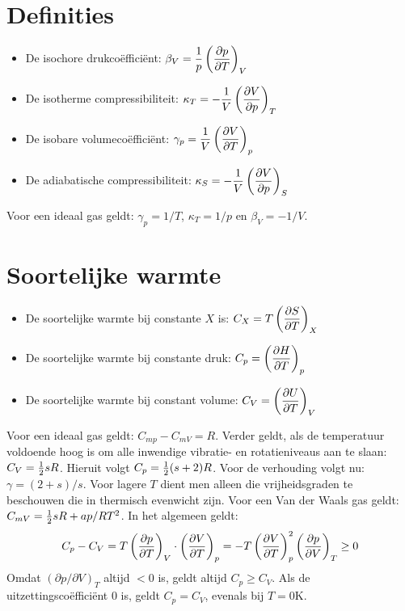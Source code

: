 \section{Definities}
\begin{itemize}
\item De isochore drukco\"effici\"ent: $\displaystyle \beta_V=\frac{1}{p}\left(\frac{\partial p}{\partial T}\right)_{V}$
\item De isotherme compressibiliteit: $\displaystyle \kappa_T=-\frac{1}{V}\left(\frac{\partial V}{\partial p}\right)_{T}$
\item De isobare volumeco\"effici\"ent: $\displaystyle \gamma_p=\frac{1}{V}\left(\frac{\partial V}{\partial T}\right)_{p}$
\item De adiabatische compressibiliteit: $\displaystyle \kappa_S=-\frac{1}{V}\left(\frac{\partial V}{\partial p}\right)_{S}$
\end{itemize}
Voor een ideaal gas geldt: $\gamma_p=1/T$, $\kappa_T=1/p$ en $\beta_V=-1/V$.

\section{Soortelijke warmte}
\begin{itemize}
\item De soortelijke warmte bij constante $X$ is: $\displaystyle C_X=T\left(\frac{\partial S}{\partial T}\right)_{X}$
\item De soortelijke warmte bij constante druk: $\displaystyle C_p=\left(\frac{\partial H}{\partial T}\right)_{p}$
\item De soortelijke warmte bij constant volume: $\displaystyle C_V=\left(\frac{\partial U}{\partial T}\right)_{V}$
\end{itemize}
Voor een ideaal gas geldt: $C_{mp}-C_{mV}=R$. Verder geldt, als de
temperatuur voldoende hoog is om alle inwendige vibratie- en rotatieniveaus
aan te slaan: $C_V=\mbox{$\frac{1}{2}$} sR$. Hieruit volgt $C_p=\mbox{$\frac{1}{2}$}(s+2)R$. Voor de
verhouding volgt nu: $\gamma=(2+s)/s$. Voor lagere $T$ dient men alleen die
vrijheidsgraden te beschouwen die in thermisch evenwicht zijn. Voor een Van
der Waals gas geldt: $C_{mV}=\mbox{$\frac{1}{2}$} sR+ap/RT^2$.
\npar
In het algemeen geldt:
\[
C_p-C_V=T\left(\frac{\partial p}{\partial T}\right)_{V}\cdot\left(\frac{\partial V}{\partial T}\right)_{p}=-T\left(\frac{\partial V}{\partial T}\right)_{p}^2\left(\frac{\partial p}{\partial V}\right)_{T}\geq0
\]
Omdat $(\partial p/\partial V)_T$ altijd $<0$ is, geldt altijd $C_p\geq C_V$.
Als de uitzettingsco\"effici\"ent 0 is, geldt $C_p=C_V$, evenals bij $T=0$K.

